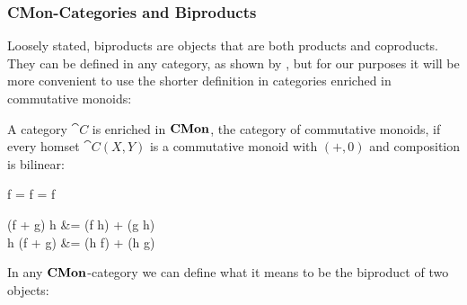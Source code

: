 \subsubsection{CMon-Categories and Biproducts}
\label{sec:biproducts}

Loosely stated, biproducts are objects that are both products and
coproducts. They can be defined in any category, as shown by
\citet{karvonen18}, but for our purposes it will be more convenient to
use the shorter definition in categories enriched in commutative
monoids:
\begin{definition}
  A category $\cat{C}$ is enriched in $\mathbf{CMon}$, the category of
  commutative monoids, if every homset $\cat{C}(X,Y)$ is a commutative
  monoid with $(+,0)$ and composition is bilinear:
  \begin{salign*}
    f \comp \zero = f = \zero \comp f
  \end{salign*}
  \begin{salign*}
    (f + g) \comp h &= (f \comp h) + (g \comp h) \\
    h \comp (f + g) &= (h \comp f) + (h \comp g)
  \end{salign*}
\end{definition}
In any $\mathbf{CMon}$-category we can define what it means to be the
biproduct of two objects:
